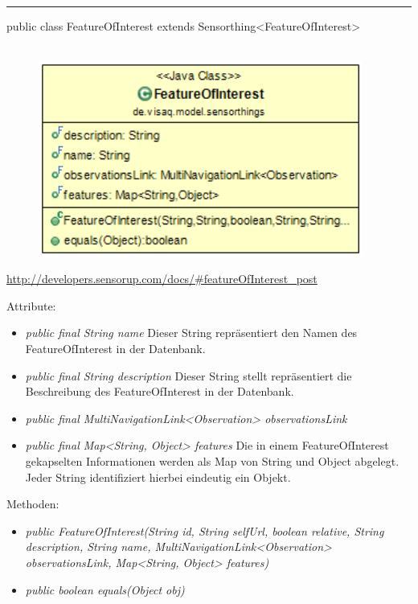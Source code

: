 \rule{\textwidth}{0.4pt}
public class FeatureOfInterest extends Sensorthing<FeatureOfInterest>
\\\\
\begin{minipage}{0.4\textwidth}
    \begin{figure}[H]
        {\centering\includegraphics[width=0.95\textwidth]{media/backend/modell/classes/FeatureOfInterest.png}}
    \end{figure}
    \end{minipage} \hfill
\begin{minipage}{0.6\textwidth}
    \url{http://developers.sensorup.com/docs/#featureOfInterest_post}
\end{minipage}

Attribute:
\begin{itemize}
    \item \emph{public final String name} Dieser String repräsentiert den Namen des FeatureOfInterest in der Datenbank.
    \item \emph{public final String description} Dieser String stellt repräsentiert die Beschreibung des FeatureOfInterest in der Datenbank.
    \item \emph{public final MultiNavigationLink<Observation> observationsLink} 
    \item \emph{public final Map<String, Object> features} Die in einem FeatureOfInterest gekapselten Informationen werden als Map von String und Object abgelegt.
    Jeder String identifiziert hierbei eindeutig ein Objekt.
\end{itemize}
Methoden:
\begin{itemize}
    \item \emph{public FeatureOfInterest(String id, String selfUrl, boolean relative, String description, String name, MultiNavigationLink<Observation> observationsLink, Map<String, Object> features)}
    \item \emph{public boolean equals(Object obj)} 
\end{itemize}

